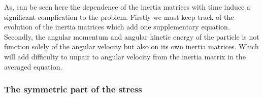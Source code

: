 As, can be seen here the dependence of the inertia matrices with time induce a significant complication to the problem. 
Firstly we must keep track of the evolution of the inertia matrices which add one supplementary equation. 
Secondly, the angular momentum and angular kinetic energy of the particle is not function solely of the angular velocity but also on its own inertia matrices. 
Which will add difficulty to unpair to angular velocity from the inertia matrix in the averaged equation. 

\subsubsection*{The symmetric part of the stress}





